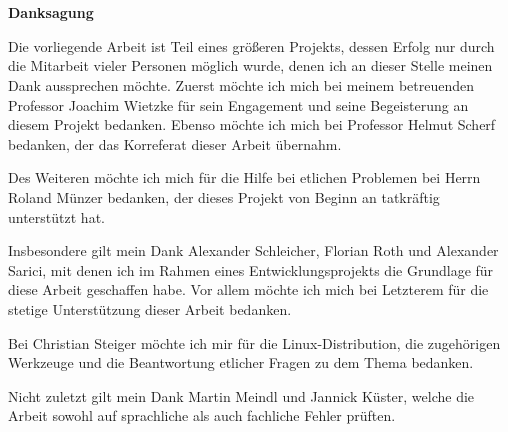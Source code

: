 \pagestyle{scrheadings}            %
\chapter*{} \label{Danksagung}
\centerline{\Large \textsf{\textbf{Danksagung}}} %
\vspace{2ex}
Die vorliegende Arbeit ist Teil eines größeren Projekts, dessen Erfolg nur durch die Mitarbeit vieler Personen möglich wurde, denen ich an dieser Stelle meinen Dank aussprechen möchte. Zuerst möchte ich mich bei meinem betreuenden Professor Joachim Wietzke für sein Engagement und seine Begeisterung an diesem Projekt bedanken. Ebenso möchte ich mich bei Professor Helmut Scherf bedanken, der das Korreferat dieser Arbeit übernahm.

Des Weiteren möchte ich mich für die Hilfe bei etlichen Problemen bei Herrn Roland Münzer bedanken, der dieses Projekt von Beginn an tatkräftig unterstützt hat.

Insbesondere gilt mein Dank Alexander Schleicher, Florian Roth und Alexander Sarici, mit denen ich im Rahmen eines Entwicklungsprojekts die Grundlage für diese Arbeit geschaffen habe. Vor allem möchte ich mich bei Letzterem für die stetige Unterstützung dieser Arbeit bedanken.

Bei Christian Steiger möchte ich mir für die Linux-Distribution, die zugehörigen Werkzeuge und die Beantwortung etlicher Fragen zu dem Thema bedanken.

Nicht zuletzt gilt mein Dank Martin Meindl und Jannick Küster, welche die Arbeit sowohl auf sprachliche als auch fachliche Fehler prüften.




\cleardoublepage